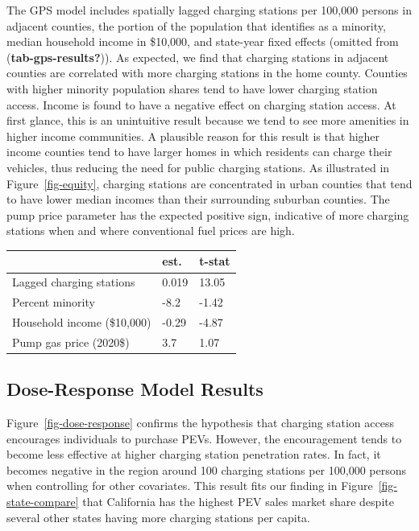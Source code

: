 \documentclass[
  letterpaper,
  DIV=11,
  numbers=noendperiod]{scrartcl}
\begin{document}
The GPS model includes spatially lagged charging stations per 100,000
persons in adjacent counties, the portion of the population that
identifies as a minority, median household income in \$10,000, and
state-year fixed effects (omitted from (\textbf{tab-gps-results?})). As
expected, we find that charging stations in adjacent counties are
correlated with more charging stations in the home county. Counties with
higher minority population shares tend to have lower charging station
access. Income is found to have a negative effect on charging station
access. At first glance, this is an unintuitive result because we tend
to see more amenities in higher income communities. A plausible reason
for this result is that higher income counties tend to have larger homes
in which residents can charge their vehicles, thus reducing the need for
public charging stations. As illustrated in Figure~\ref{fig-equity},
charging stations are concentrated in urban counties that tend to have
lower median incomes than their surrounding suburban counties. The pump
price parameter has the expected positive sign, indicative of more
charging stations when and where conventional fuel prices are high.

\hypertarget{tab-gps-results}{}
\begin{longtable}[]{@{}lll@{}}
\toprule()
~ & est. & t-stat \\
\midrule()
\endhead
Lagged charging stations & 0.019 & 13.05 \\
Percent minority & -8.2 & -1.42 \\
Household income (\$10,000) & -0.29 & -4.87 \\
Pump gas price (2020\$) & 3.7 & 1.07 \\
\bottomrule()
\end{longtable}

\hypertarget{dose-response-model-results}{%
\subsection{Dose-Response Model
Results}\label{dose-response-model-results}}

Figure~\ref{fig-dose-response} confirms the hypothesis that charging
station access encourages individuals to purchase PEVs. However, the
encouragement tends to become less effective at higher charging station
penetration rates. In fact, it becomes negative in the region around 100
charging stations per 100,000 persons when controlling for other
covariates. This result fits our finding in
Figure~\ref{fig-state-compare} that California has the highest PEV sales
market share despite several other states having more charging stations
per capita.
\end{document}
